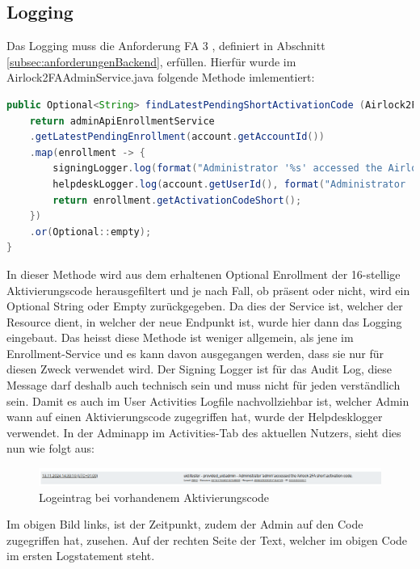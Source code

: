 \subsection{Logging}
Das Logging muss die Anforderung \flqq FA 3\frqq{} , definiert in Abschnitt \ref{subsec:anforderungenBackend}, erfüllen. Hierfür wurde im Airlock2FAAdminService.java folgende Methode imlementiert:
\begin{lstlisting}[language=Java]
	public Optional<String> findLatestPendingShortActivationCode (Airlock2FAUserAccount account) {
	return adminApiEnrollmentService
	.getLatestPendingEnrollment(account.getAccountId())
	.map(enrollment -> {
		signingLogger.log(format("Administrator '%s' accessed the Airlock 2FA short activation code of user '%s'.", administrator.getName(), account.getUserId()));
		helpdeskLogger.log(account.getUserId(), format("Administrator '%s' accessed the Airlock 2FA short activation code.", administrator.getName()));
		return enrollment.getActivationCodeShort();
	})
	.or(Optional::empty);
}
\end{lstlisting}
In dieser Methode wird aus dem erhaltenen Optional Enrollment der 16-stellige Aktivierungscode herausgefiltert und je nach Fall, ob präsent oder nicht, wird ein Optional String oder Empty zurückgegeben. Da dies der Service ist, welcher der Resource dient, in welcher der neue Endpunkt ist, wurde hier dann das Logging eingebaut. Das heisst diese Methode ist weniger allgemein, als jene im Enrollment-Service und es kann davon ausgegangen werden, dass sie nur für diesen Zweck verwendet wird. Der Signing Logger ist für das Audit Log, diese Message darf deshalb auch technisch sein und muss nicht für jeden verständlich sein.
Damit es auch im User Activities Logfile nachvollziehbar ist, welcher Admin wann auf einen Aktivierungscode zugegriffen hat, wurde der Helpdesklogger verwendet. In der Adminapp im Activities-Tab des aktuellen Nutzers, sieht dies nun wie folgt aus:
\begin{figure}[H]
	\begin{center}
		\includegraphics[width=1.0\textwidth]{ressourcen/logpresent}
		\caption[Logeintrag bei vorhandenem Aktivierungscode]{Logeintrag bei vorhandenem Aktivierungscode}\label{fig:logpresent}
	\end{center}
\end{figure}
\noindent Im obigen Bild links, ist der Zeitpunkt, zudem der Admin auf den Code zugegriffen hat, zusehen. Auf der rechten Seite der Text, welcher im obigen Code im ersten Logstatement steht. 

